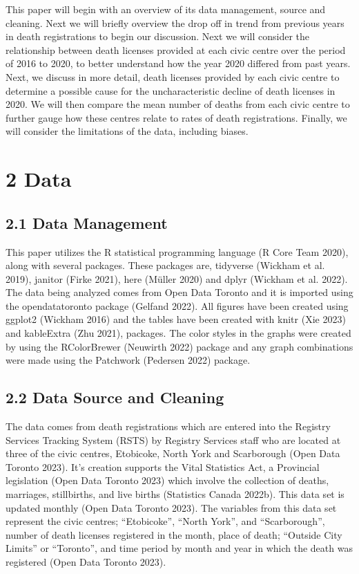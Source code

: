 \documentclass[
  letterpaper,
  DIV=11,
  numbers=noendperiod]{scrartcl}
\begin{document}
This paper will begin with an overview of its data management, source
and cleaning. Next we will briefly overview the drop off in trend from
previous years in death registrations to begin our discussion. Next we
will consider the relationship between death licenses provided at each
civic centre over the period of 2016 to 2020, to better understand how
the year 2020 differed from past years. Next, we discuss in more detail,
death licenses provided by each civic centre to determine a possible
cause for the uncharacteristic decline of death licenses in 2020. We
will then compare the mean number of deaths from each civic centre to
further gauge how these centres relate to rates of death registrations.
Finally, we will consider the limitations of the data, including biases.

\hypertarget{data}{%
\section{2 Data}\label{data}}

\hypertarget{data-management}{%
\subsection{2.1 Data Management}\label{data-management}}

This paper utilizes the R statistical programming language (R Core Team
2020), along with several packages. These packages are, tidyverse
(Wickham et al. 2019), janitor (Firke 2021), here (Müller 2020) and
dplyr (Wickham et al. 2022). The data being analyzed comes from Open
Data Toronto and it is imported using the opendatatoronto package
(Gelfand 2022). All figures have been created using ggplot2 (Wickham
2016) and the tables have been created with knitr (Xie 2023) and
kableExtra (Zhu 2021), packages. The color styles in the graphs were
created by using the RColorBrewer (Neuwirth 2022) package and any graph
combinations were made using the Patchwork (Pedersen 2022) package.

\hypertarget{data-source-and-cleaning}{%
\subsection{2.2 Data Source and
Cleaning}\label{data-source-and-cleaning}}

The data comes from death registrations which are entered into the
Registry Services Tracking System (RSTS) by Registry Services staff who
are located at three of the civic centres, Etobicoke, North York and
Scarborough (Open Data Toronto 2023). It's creation supports the Vital
Statistics Act, a Provincial legislation (Open Data Toronto 2023) which
involve the collection of deaths, marriages, stillbirths, and live
births (Statistics Canada 2022b). This data set is updated monthly (Open
Data Toronto 2023). The variables from this data set represent the civic
centres; ``Etobicoke'', ``North York'', and ``Scarborough'', number of
death licenses registered in the month, place of death; ``Outside City
Limits'' or ``Toronto'', and time period by month and year in which the
death was registered (Open Data Toronto 2023).
\end{document}
